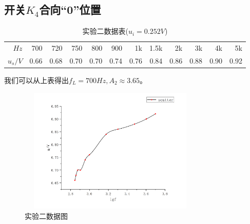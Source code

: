 \documentclass[a4 paper,12pt]{article}
\begin{document}
    \subsection{开关$K_{4}$合向“0”位置}
        \begin{table}[H]
    	\centering
    	\caption{实验二数据表($u_{i}=0.252V$)}
    	\label{实验二数据表}
    	\begin{tabular}{|r|r|r|r|r|r|r|r|r|r|r|r|}
    		\toprule[0.5mm]
    		$Hz$&700&720&750&800&900&1k&1.5k&2k&3k&4k&5k\\
    		$u_{s}/V$&0.66&0.68&0.70&0.70&0.74&0.76&0.84&0.86&0.88&0.90&0.92\\
    		\bottomrule[0.5mm]
    	\end{tabular}
    \end{table}
    \par 我们可以从上表得出$f_{L}=700Hz,A_{2}\approx 3.65$。
    		\begin{figure}[H]
    	\centering
    	\includegraphics[width=8.8cm,height=6cm]  {实验二.png} 
    	\caption{\label{1} 实验二数据图}
    	\end{figure}
\end{document}

